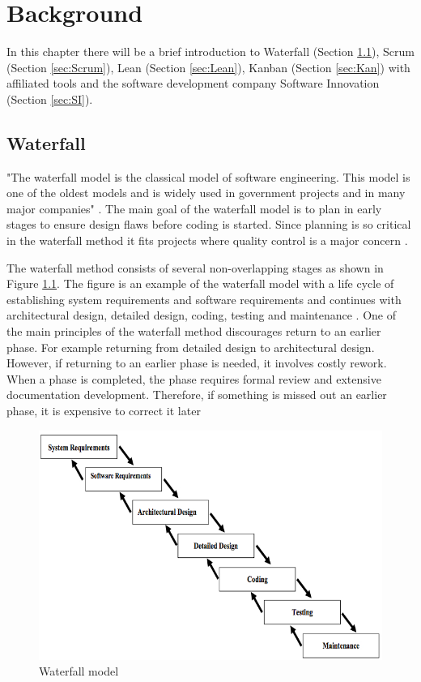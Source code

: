 \documentclass[UKenglish]{ifimaster}  %
\begin{document}
\chapter{Background}  
\label{chap:Background}                %
In this chapter there will be a brief introduction to Waterfall (Section \ref{sec:WP}), Scrum (Section \ref{sec:Scrum}), Lean (Section \ref{sec:Lean}), Kanban (Section \ref{sec:Kan}) with affiliated tools and the software development company Software Innovation (Section \ref{sec:SI}).

\section {Waterfall}
\label{sec:WP}
"The waterfall model is the classical model of software engineering. This model is one of the oldest models and is widely used in government projects and in many major companies" \parencite{munassar2010comparison}. The main goal of the waterfall model is to plan in early stages to ensure design flaws before coding is started. Since planning is so critical in the waterfall method it fits projects where quality control is a major concern  \parencite{munassar2010comparison}.

The waterfall method consists of several non-overlapping stages as shown in Figure \ref{fig:waterfall}. The figure is an example of the waterfall model with a life cycle of establishing system requirements and software requirements and continues with architectural design, detailed design, coding, testing and maintenance  \parencite{munassar2010comparison}. One of the main principles of the waterfall method discourages return to an earlier phase. For example returning from detailed design to architectural design. However, if returning to an earlier phase is needed, it involves costly rework. When a phase is completed, the phase requires formal review and extensive documentation development. Therefore, if something is missed out an earlier phase, it is expensive to correct it later  \parencite{munassar2010comparison}


\begin{figure}[ht!]
\centering
\includegraphics[scale=0.7]{Picture/waterfall.jpg}
\caption{Waterfall model}
\label{fig:waterfall} %
\end{figure}
\end{document}
